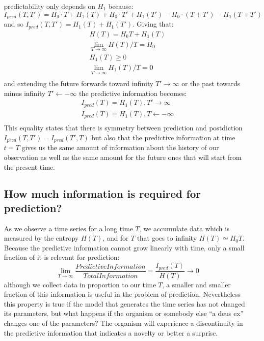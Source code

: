  predictability only depends on $H_1$ because:
\begin{equation}
I_{pred}(T,T')=H_0\cdot T + H_1(T) +H_0\cdot T' + H_1(T') -H_0\cdot (T+T')-H_1(T+T')
\end{equation}
and so $I_{pred}(T,T')=H_1(T)+H_1(T')$. Giving that:
\begin{eqnarray}
 H(T)=H_0 T + H_1(T)\\
\lim_{T\to\infty} H(T)/T=H_0\\
H_1(T)\geqslant 0\\
\lim_{T\to\infty} H_1(T)/T=0\\
\end{eqnarray}
and extending the future forwards toward infinity $T' \rightarrow \infty$ or the
 past towards minus infinity $T' \leftarrow -\infty$ the predictive information becomes:
\begin{eqnarray}
I_{pred}(T)=H_1(T), T' \rightarrow \infty\\
I_{pred}(T)=H_1(T), T \leftarrow -\infty\\
\end{eqnarray}
This equality states that there is symmetry between prediction and postdiction
 $I_{pred}(T,T')=I_{pred}(T',T)$ but also that the predictive information at
time $t=T$ gives us the same amount of information about the history of our
observation as well as the same amount for the future ones that will start from
 the present time.
\subsection{How much information is required for prediction?}
\label{Appendix:InfoForPrediction}
As we observe a time series for a long time $T$, we accumulate data which is measured
 by the entropy $H(T)$, and for $T$ that goes to infinity $H(T)\simeq H_0 T$.
Because the predictive information cannot grow linearly with time, only a small
 fraction of it is relevant for prediction:
\begin{equation}
\lim_{T\to\infty}\frac{PredictiveInformation}{TotalInformation}=\frac{I_{pred}(T)}{H(T)} \rightarrow 0
\end{equation}
although we collect data in proportion to our time $T$, a smaller and smaller fraction
 of this information is useful in the problem of prediction. Nevertheless this
property is true if the model that generates the time series has not changed its
 parameters, but what happens if the organism or somebody else ``a deus ex''
changes one of the parameters? The organism will experience a discontinuity
in the predictive information that indicates a novelty or better a surprise.
 
